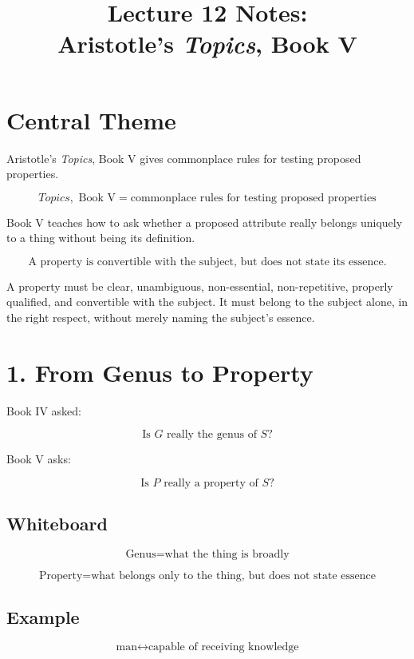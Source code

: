 \documentclass[12pt]{article}
\title{Lecture 12 Notes:\\ Aristotle's \textit{Topics}, Book V}
\author{}
\date{}
\begin{document}
\maketitle

\section*{Central Theme}

Aristotle's \textit{Topics}, Book V gives commonplace rules for testing
proposed properties.

\[
\boxed{
\textit{Topics}, \text{ Book V}
=
\text{commonplace rules for testing proposed properties}
}
\]

Book V teaches how to ask whether a proposed attribute really belongs uniquely
to a thing without being its definition.

\[
\boxed{
\text{A property is convertible with the subject, but does not state its essence.}
}
\]

A property must be clear, unambiguous, non-essential, non-repetitive, properly
qualified, and convertible with the subject. It must belong to the subject
alone, in the right respect, without merely naming the subject's essence.

\section*{1. From Genus to Property}

Book IV asked:

\[
\text{Is } G \text{ really the genus of } S?
\]

Book V asks:

\[
\text{Is } P \text{ really a property of } S?
\]

\subsection*{Whiteboard}

\[
\text{Genus} = \text{what the thing is broadly}
\]

\[
\text{Property} = \text{what belongs only to the thing, but does not state essence}
\]

\subsection*{Example}

\[
\text{man} \leftrightarrow \text{capable of receiving knowledge}
\]
\end{document}
